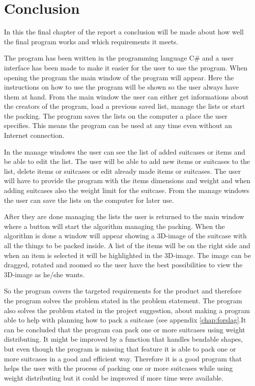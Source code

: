 \chapter{Conclusion}
In this the final chapter of the report a conclusion will be made about how well the final program works and which requirements it meets.

The program has been written in the programming language C\# and a user interface has been made to make it easier for the user to use the program. When opening the program the main window of the program will appear. Here the instructions on how to use the program will be shown so the user always have them at hand. From the main window the user can either get informations about the creators of the program, load a previous saved list, manage the lists or start the packing. The program saves the lists on the computer a place the user specifies. This means the program can be used at any time even without an Internet connection. 

In the manage windows the user can see the list of added suitcases or items and be able to edit the list. The user will be able to add new items or suitcases to the list, delete items or suitcases or edit already made items or suitcases. The user will have to provide the program with the items dimensions and weight and when adding suitcases also the weight limit for the suitcase. From the manage windows the user can save the lists on the computer for later use. 

After they are done managing the lists the user is returned to the main window where a button will start the algorithm managing the packing. When the algorithm is done a window will appear showing a 3D-image of the suitcase with all the things to be packed inside. A list of the items will be on the right side and when an item is selected it will be highlighted in the 3D-image. The image can be dragged, rotated and zoomed so the user have the best possibilities to view the 3D-image as he/she wants.

So the program covers the targeted requirements for the product and therefore the program solves the problem stated in the problem statement. The program also solves the problem stated in the project suggestion, about making a program able to help with planning how to pack a suitcase (see appendix \ref{chap:forslag}.It can be concluded that the program can pack one or more suitcases using weight distributing. It might be improved by a function that handles bendable shapes, but even though the program is missing that feature it is able to pack one or more suitcases in a good and efficient way. Therefore it is a good program that helps the user with the process of packing one or more suitcases while using weight distributing but it could be improved if more time were available. 